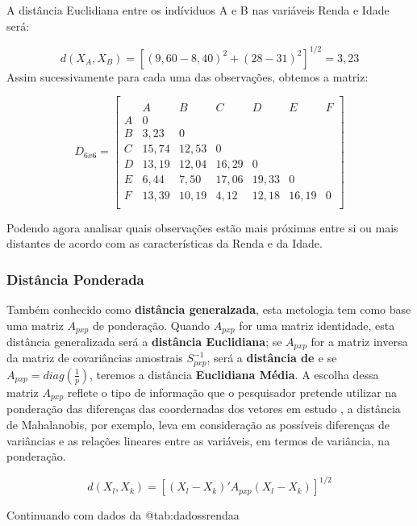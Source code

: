 \documentclass[
]{book}
\begin{document}
A distância Euclidiana entre os indíviduos A e B nas variáveis Renda e Idade será:

\[d(X_A,X_B)=[(9,60-8,40)^2+(28-31)^2]^{1/2}=3,23\]
Assim sucessivamente para cada uma das observações, obtemos a matriz:

\[D_{6x6}=\begin{bmatrix}\\
 &A&B&C&D&E&F \\
 A&0&&&&&\\
 B&3,23&0&&&&\\
 C & 15,74& 12,53&0&&&\\
 D& 13,19& 12,04& 16,29&0&&\\
 E& 6,44& 7,50& 17,06& 19,33&0&\\
 F& 13,39& 10,19& 4,12& 12,18& 16,19&0 \\
\end{bmatrix}\]

Podendo agora analisar quais observações estão mais próximas entre si ou mais distantes de acordo com as características da Renda e da Idade.

\hypertarget{distponderada}{%
\subsubsection{Distância Ponderada}\label{distponderada}}

Também conhecido como \textbf{distância generalzada}, esta metologia tem como base uma matriz \(A_{pxp}\) de ponderação. Quando \(A_{pxp}\) for uma matriz identidade, esta distância generalizada será a \textbf{distância Euclidiana}; se \(A_{pxp}\) for a matriz inversa da matriz de covariâncias amostrais \(S^{-1}_{pxp}\), será a \textbf{distância de \citet{mahalanobis1936generalized}} e se \(A_{pxp}=diag(\frac{1}{p})\), teremos a distância \textbf{Euclidiana Média}. A escolha dessa matriz \(A_{pxp}\) reflete o tipo de informação que o pesquisador pretende utilizar na ponderação das diferenças das coordernadas dos vetores em estudo \citep{mingoti2007analise}, a distância de Mahalanobis, por exemplo, leva em consideração as possíveis diferenças de variâncias e as relações lineares entre as variáveis, em termos de variância, na ponderação.

\begin{equation} 
  d(X_l,X_k)=[(X_l-X_k)'A_{pxp}(X_l - X_k)]^{1/2}
  \label{eq:distpond}
\end{equation}

Continuando com dados da @tab:dadossrendaa
\end{document}
